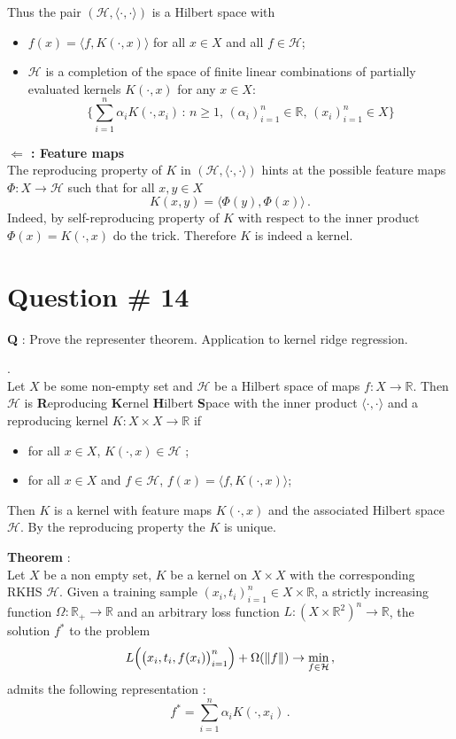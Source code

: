 \documentclass[a4paper]{article}
\newcommand{\Real}{\mathbb{R}}
\newcommand{\Hcal}{\mathcal{H}}
\begin{document}
Thus the pair $(\Hcal,\langle\cdot,\cdot\rangle)$ is a Hilbert space with \begin{itemize}
	\item $f(x) = \langle f, K(\cdot, x)\rangle$ for all $x\in X$ and all $f\in\Hcal$;
	\item $\Hcal$ is a completion of the space of finite linear combinations of
	partially evaluated kernels $K(\cdot,x)$ for any $x\in X$:
	\[ \bigl\{ \sum_{i=1}^n \alpha_i K(\cdot,x_i)\,:\,n\geq1,\,(\alpha_i)_{i=1}^n\in \Real,\,(x_i)_{i=1}^n\in X \bigr\} \]
\end{itemize}

\noindent \textbf{ $\Leftarrow$ : Feature maps}\hfill\\
The reproducing property of $K$ in $(\Hcal,\langle\cdot,\cdot\rangle)$ hints at
the possible feature maps $\Phi:X\to \Hcal$ such that for all $x,y\in X$
\[ K(x,y) = \langle \Phi(y), \Phi(x)\rangle\,. \]
Indeed, by self-reproducing property of $K$ with respect to the inner product
$\Phi(x) = K(\cdot,x)$ do the trick. Therefore $K$ is indeed a kernel.

\clearpage

\section[Representer]{Question \# 14} %
\label{sec:question_14}
\textbf{\large \textbf{Q}} : Prove the representer theorem. Application to kernel
ridge regression.

 .\hfill\\
Let $X$ be some non-empty set and $\Hcal$ be a Hilbert space of maps $f:X\to\Real$.
Then $\Hcal$ is \textbf{R}eproducing \textbf{K}ernel \textbf{H}ilbert \textbf{S}pace
with the inner product $\langle\cdot, \cdot\rangle$ and a reproducing kernel $K: X\times X\to \Real$
if \begin{itemize}
	\item for all $x\in X$, $K(\cdot,x) \in \Hcal$ ;
	\item for all $x\in X$ and $f\in \Hcal$, $f(x) = \langle f, K(\cdot, x) \rangle$;
\end{itemize}
Then $K$ is a kernel with feature maps $K(\cdot,x)$ and the associated Hilbert space
$\Hcal$. By the reproducing property the $K$ is unique.

\noindent\textbf{Theorem} : \hfill\\
Let $X$ be a non empty set, $K$ be a kernel on $X\times X$ with the corresponding
RKHS $\Hcal$. Given a training sample $(x_i, t_i)_{i=1}^n \in X \times \Real$, a
strictly increasing function $\Omega:\Real_+\to\Real$ and an arbitrary loss function
$L:( X\times \Real^2)^n \to \Real$, the solution $f^*$ to the problem
\[
L\Bigl( \bigl(x_i,t_i,f(x_i)\bigr)_{i=1}^n \Bigr) + \Omega(\|f\|) \to \min_{f\in \Hcal}\,,
\]
admits the following representation :
\[ f^* = \sum_{i=1}^n \alpha_i K( \cdot, x_i ) \,. \]
\end{document}
